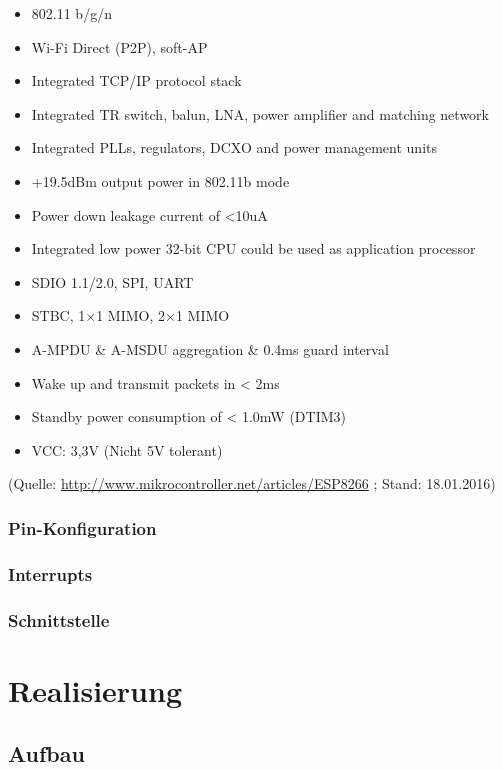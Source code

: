 \begin{itemize}
	\item 802.11 b/g/n
    \item Wi-Fi Direct (P2P), soft-AP
    \item Integrated TCP/IP protocol stack
    \item Integrated TR switch, balun, LNA, power amplifier and matching network
    \item Integrated PLLs, regulators, DCXO and power management units
    \item +19.5dBm output power in 802.11b mode
    \item Power down leakage current of <10uA
    \item Integrated low power 32-bit CPU could be used as application processor
    \item SDIO 1.1/2.0, SPI, UART
    \item STBC, 1×1 MIMO, 2×1 MIMO
    \item A-MPDU \& A-MSDU aggregation \& 0.4ms guard interval
    \item Wake up and transmit packets in < 2ms
    \item Standby power consumption of < 1.0mW (DTIM3)
    \item VCC: 3,3V (Nicht 5V tolerant)
\end{itemize}
(Quelle: \url{http://www.mikrocontroller.net/articles/ESP8266} ; Stand: 18.01.2016)
\subsubsection{Pin-Konfiguration}
\subsubsection{Interrupts}
\subsubsection{Schnittstelle}

\section{Realisierung}
\subsection{Aufbau}

